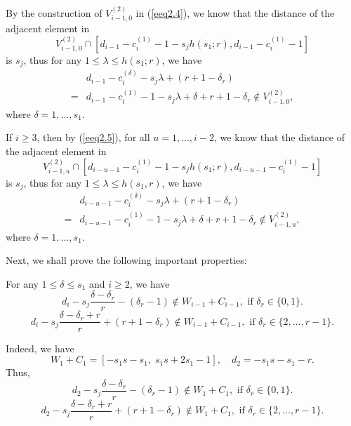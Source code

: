 \documentclass[12pt]{article}
\numberwithin{equation}{section}
\begin{document}
By the construction of $V_{i-1,0}^{(2)}$ in (\ref{eeq2.4}), we know that the distance of the adjacent element in $$V_{i-1,0}^{(2)}\cap\left[d_{i-1}-c_{i}^{(1)}-1-s_jh(s_1;r), d_{i-1}-c_{i}^{(1)}-1\right]$$ is $s_j$, thus for any $1\leqslant \lambda \leqslant h(s_1;r)$, we have
\begin{align}&d_{i-1}-c_{i}^{(\delta)}-s_j\lambda+(r+1-\delta_r)\tag{iv-f-2}\\
=&d_{i-1}-c_{i}^{(1)}-1-s_j\lambda+\delta+r+1-\delta_r\notin V_{i-1,0}^{(2)},\nonumber
\end{align}
where $\delta=1,\ldots,s_1.$

If $i\geq 3$, then by (\ref{eeq2.5}), for all $u=1,\ldots, i-2$, we know that the distance of the adjacent element in$$V_{i-1,u}^{(2)}\cap\left[d_{i-u-1}-c_{i}^{(1)}-1-s_jh(s_1;r), d_{i-u-1}-c_{i}^{(1)}-1\right]$$
is $s_j$, thus for any $1\leqslant \lambda\leqslant h(s_1,r)$, we have
\begin{align}&d_{i-u-1}-c_{i}^{(\delta)}-s_j\lambda+(r+1-\delta_r)\tag{iv-g-2}\\
=&d_{i-u-1}-c_{i}^{(1)}-1-s_j\lambda+\delta+r+1-\delta_r\notin V_{i-1,u}^{(2)},\nonumber
\end{align}
where $\delta=1,\ldots,s_1.$

Next, we shall prove the following important properties:

For any $1\leqslant\delta\leqslant s_1$ and $i\geqslant 2$, we have
\begin{equation}\label{iv-h-1}d_{i}-s_j\frac{\delta-\delta_r}{r}-(\delta_r-1)\notin W_{i-1}+C_{i-1}, \text{ if }\delta_r\in \{0,1\}.\tag{iv-h-1}\end{equation}
\begin{equation}\label{iv-h-2}d_{i}-s_j\frac{\delta-\delta_r+r}{r}+(r+1-\delta_r)\notin W_{i-1}+C_{i-1}, \text{ if }\delta_r\in \{2,\ldots,r-1\}.\tag{iv-h-2}\end{equation}

 Indeed, we have $$W_{1} + C_{1} = \left[-s_1s-s_1,\; s_1s+2s_1-1\right], \quad d_{2}=-s_1s-s_1-r.$$
Thus,
$$d_{2} -s_j\frac{\delta-\delta_r}{r}-(\delta_r-1) \notin W_{1} + C_{1}, \text{ if }\delta_r\in \{0,1\}.$$
$$d_{2}-s_j\frac{\delta-\delta_r+r}{r}+(r+1-\delta_r) \notin W_{1} + C_{1}, \text{ if }\delta_r\in \{2,\ldots,r-1\}.$$
\end{document}
